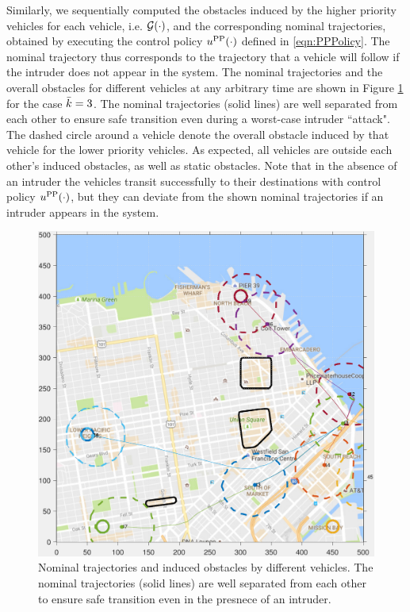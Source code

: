 Similarly, we sequentially computed the obstacles induced by the higher priority vehicles for each vehicle, i.e. $\mathcal{G}(\cdot)$, and the corresponding nominal trajectories, obtained by executing the control policy $u^{\text{PP}}(\cdot)$ defined in \eqref{eqn:PPPolicy}. The nominal trajectory thus corresponds to the trajectory that a vehicle will follow if the intruder does not appear in the system. The nominal trajectories and the overall obstacles for different vehicles at any arbitrary time are shown in Figure \ref{fig:trajObsSim} for the case $\bar{k} = 3$.  The nominal trajectories (solid lines) are well separated from each other to ensure safe transition even during a worst-case intruder ``attack". The dashed circle around a vehicle denote the overall obstacle induced by that vehicle for the lower priority vehicles. As expected, all vehicles are outside each other's induced obstacles, as well as static obstacles. %
Note that in the absence of an intruder the vehicles transit successfully to their destinations with control policy $u^{\text{PP}}(\cdot)$, but they can deviate from the shown nominal trajectories if an intruder appears in the system.
\begin{figure}[H]
  \centering
  \includegraphics[width=\columnwidth]{"figs/nomTraj"}
  \caption{Nominal trajectories and induced obstacles by different vehicles. The nominal trajectories (solid lines) are well separated from each other to ensure safe transition even in the presnece of an intruder.}
  \label{fig:trajObsSim}
\end{figure}

